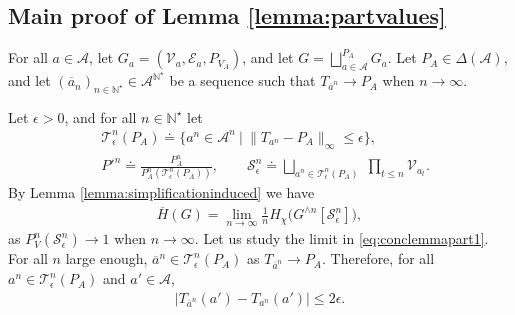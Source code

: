 \documentclass[conference,a4paper]{IEEEtran}
\begin{document}
\subsection{Main proof of Lemma \ref{lemma:partvalues}}

For all $a \in \mathcal{A}$, let $G_a = (\mathcal{V}_a, \mathcal{E}_a, P_{V_A})$, and let $G = \bigsqcup^{P_A}_{a \in \mathcal{A}} G_a$. Let $P_A \in \Delta(\mathcal{A})$, and let $(\overline{a}_n)_{n \in \mathbb{N}^\star} \in \mathcal{A}^{\mathbb{N}^\star}$ be a sequence such that $T_{\overline{a}^n} \rightarrow P_A$ when $n \rightarrow \infty$.%

Let $\epsilon > 0$, and for all $n \in \mathbb{N}^\star$ let 
\begin{align}
    & \mathcal{T}^n_\epsilon(P_A) \doteq \big\lbrace a^n \in \mathcal{A}^n \:\big|\: \| T_{a^n} - P_A \|_\infty \leq \epsilon \big\rbrace, \label{eq:lemmapartA0} \\
    & P'^n \doteq \frac{P^n_A}{P^n_A(\mathcal{T}^n_\epsilon(P_A))},\qquad \mathcal{S}_\epsilon^n \doteq \bigsqcup_{a^n \in \mathcal{T}^n_\epsilon(P_A)} \;\prod_{t \leq n} \mathcal{V}_{a_t}. \nonumber
\end{align}
By Lemma \ref{lemma:simplificationinduced} we have 
\begin{align}
      \overline{H}(G) = \lim_{n \rightarrow \infty} \frac{1}{n}H_\chi\Big(G^{\wedge n}[\mathcal{S}^n_\epsilon]\Big),\label{eq:conclemmapart1}
\end{align}
as $P^n_V(\mathcal{S}^n_\epsilon) \rightarrow 1$ when $n \rightarrow \infty$. Let us study the limit in \eqref{eq:conclemmapart1}. For all $n$ large enough, $\overline{a}^n \in \mathcal{T}^n_\epsilon(P_A)$ as $T_{\overline{a}^n} \rightarrow P_A$. Therefore, for all $a^n \in \mathcal{T}^n_\epsilon(P_A)$ and $a' \in \mathcal{A}$,
\begin{align}
    \big|T_{\overline{a}^n}(a')-T_{a^n}(a')\big|\leq 2\epsilon.\label{eq:lemmapartB0}
\end{align}
\end{document}

